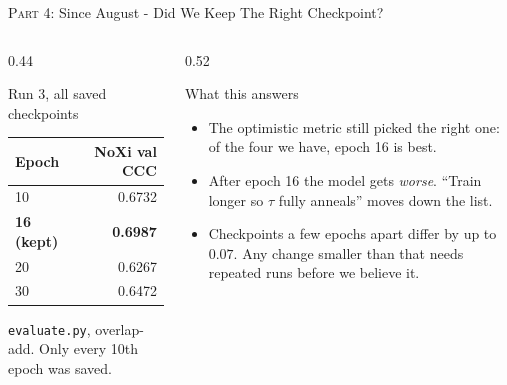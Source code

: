 \documentclass[aspectratio=169]{beamer}
\newcommand{\hl}[1]{\textcolor{coolpurple}{\textbf{#1}}}
\begin{document}
	\begin{frame}{\textsc{Part 4:} Since August - Did We Keep The Right Checkpoint?}
		\begin{columns}[onlytextwidth]
			\begin{column}{0.44\textwidth}
				\begin{block}{Run 3, all saved checkpoints}
					\small
					\begin{tabular}{lr}
						Epoch & NoXi val CCC \\
						\hline
						10 & 0.6732 \\
						\textbf{16 (kept)} & \hl{0.6987} \\
						20 & 0.6267 \\
						30 & 0.6472 \\
					\end{tabular}
					\vspace{0.3em}

					\footnotesize \texttt{evaluate.py}, overlap-add. Only every 10th epoch was saved.
				\end{block}
			\end{column}
			\begin{column}{0.52\textwidth}
				\begin{block}{What this answers}
					\small
					\begin{itemize}
						\item The optimistic metric still picked the right one: of the four we
						have, epoch 16 is best.
						\item After epoch 16 the model gets \emph{worse}. ``Train longer so $\tau$
						fully anneals'' moves down the list.
						\item Checkpoints a few epochs apart differ by up to $0.07$. Any change
						smaller than that needs repeated runs before we believe it.
					\end{itemize}
				\end{block}
			\end{column}
		\end{columns}
	\end{frame}
\end{document}
